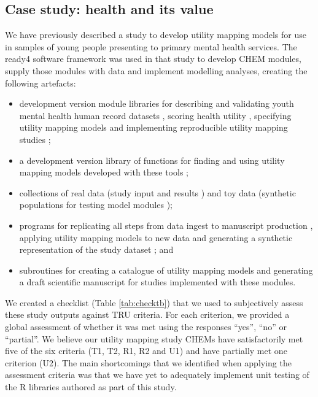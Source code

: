 \documentclass[sn-vancouver,Numbered,pdflatex]{sn-jnl}
\theoremstyle{remark}
\theoremstyle{definition}
\begin{document}
\hypertarget{case-study-health-and-its-value}{%
\subsection{Case study: health and its value}\label{case-study-health-and-its-value}}

We have previously described a study \citep{Hamilton2021.07.07.21260129} to develop utility mapping models for use in samples of young people presenting to primary mental health services. The ready4 software framework was used in that study to develop CHEM modules, supply those modules with data and implement modelling analyses, creating the following artefacts:

\begin{itemize}
\item
  development version module libraries for describing and validating youth mental health human record datasets \citep{hamilton_matthew_2022_6084467}, scoring health utility \citep{hamilton_matthew_2022_6084824}, specifying utility mapping models \citep{hamilton_matthew_2022_6116701} and implementing reproducible utility mapping studies \citep{gao_caroline_2022_6130155};
\item
  a development version library of functions for finding and using utility mapping models developed with these tools \citep{matthew_p_hamilton_2021_5646669};
\item
  collections of real data (study input and results \citep{DVN/DKDIB0_2021}) and toy data (synthetic populations for testing model modules \citep{DVN/HJXYKQ_2021});
\item
  programs for replicating all steps from data ingest to manuscript production \citep{hamilton_matthew_2022_6129906}, applying utility mapping models to new data \citep{hamilton_matthew_2022_6416330} and generating a synthetic representation of the study dataset \citep{hamilton_matthew_p_2022_6321821}; and
\item
  subroutines for creating a catalogue of utility mapping models \citep{hamilton_matthew_2022_6116385} and generating a draft scientific manuscript \citep{matthew_p_hamilton_2022_5976988} for studies implemented with these modules.
\end{itemize}

We created a checklist (Table \ref{tab:checktb}) that we used to subjectively assess these study outputs against TRU criteria. For each criterion, we provided a global assessment of whether it was met using the responses ``yes'', ``no'' or ``partial''. We believe our utility mapping study CHEMs have satisfactorily met five of the six criteria (T1, T2, R1, R2 and U1) and have partially met one criterion (U2). The main shortcomings that we identified when applying the assessment criteria was that we have yet to adequately implement unit testing of the R libraries authored as part of this study.
\end{document}
